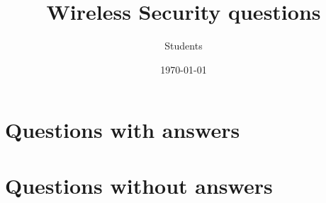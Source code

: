 \documentclass{exam}
\title{Wireless Security questions}
\date{\today}
\author{Students}
\begin{document}
\maketitle
\tableofcontents

\part{Questions with answers}
\printanswers



\part{Questions without answers}
\noprintanswers


\end{document}
